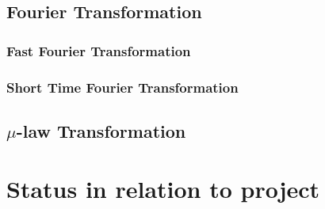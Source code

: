 \subsection{Fourier Transformation}
\label{sub:Fourier-Transformation}

\subsubsection{Fast Fourier Transformation}
\label{subsub:Fast-Fourier-Transformation}

\subsubsection{Short Time Fourier Transformation}
\label{subsub:Short-Time-Fourier-Transformation}

\subsection{$\mu$-law Transformation}
\label{sub:Mu-Law-Transformation}

\section{Status in relation to project}
\label{sec:Status-Relation-Project}
